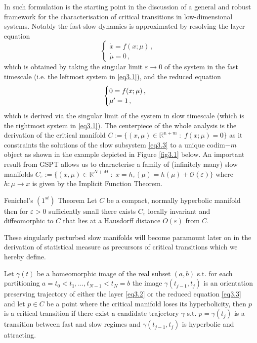 \documentclass[../main.tex]{subfiles}
\begin{document}
In \cite{Kuehn11} such formulation is the starting point in the discussion of a general and robust framework for the characterisation of critical transitions in low-dimensional systems.
Notably the fast-slow dynamics is approximated by resolving the layer equation
\begin{equation}\label{eq3.2}
   \begin{cases}
           \dot{x}=f(x;\mu) \,, \\
           \dot{\mu}=0 \,, 
   \end{cases}
\end{equation}
which is obtained by taking the singular limit $\varepsilon\to0$ of the system in the fast timescale (i.e. the leftmost system in \eqref{eq3.1}), and the reduced equation
\begin{equation}\label{eq3.3}
   \begin{cases}
      0=f(x;\mu) \,, \\
      \mu'=1 \,, 
   \end{cases}
\end{equation}
which is derived via the singular limit of the system in slow timescale (which is the rightmost system in \eqref{eq3.1}).
The centerpiece of the whole analysis is the derivation of the critical manifold $C:=\{(x,\mu)\in \mathbb{R}^{n+m}\;:\;f(x;\mu)=0\}$ as it constraints the solutions of the slow subsystem \eqref{eq3.3} to a unique codim$-m$ object as shown in the example depicted in Figure \ref{fig3.1} below.
An important result from GSPT allows us to characterise a family of (infinitely many) slow manifolds $C_{\varepsilon}:=\{(x,\mu)\in \mathbb{R}^{N+M}\;:\;x=h_{\varepsilon}(\mu)=h(\mu)+\mathcal{O}(\varepsilon)\}$ where $h:\mu\to x$ is given by the Implicit Function Theorem.
\begin{theorem}[label=thm3.1]{Fenichel's $(1^{st})$ Theorem}{}
     Let $C$ be a compact, normally hyperbolic manifold then for $\varepsilon>0$ sufficiently small there exists $C_{\varepsilon}$ locally invariant and diffeomorphic to $C$ that lies at a Hausdorff distance $O(\varepsilon)$ from $C$.
\end{theorem}
These singularly perturbed slow manifolds will become paramount later on in the derivation of statistical measure as precursors of critical transitions which we hereby define.
\begin{definition}\label{def3.1}
     Let $\gamma(t)$ be a homeomorphic image of the real subset $(a,b)$ s.t. for each partitioning ${a=t_{0}<t_1,\dots,t_{N-1}<t_N=b}$ the image $\gamma(t_{j-1},t_j)$ is an orientation preserving trajectory of either the layer \eqref{eq3.2} or the reduced equation \eqref{eq3.3} and let $p\in C$ be a point where the critical manifold loses its hyperbolicity, then $p$ is a critical transition if there exist a candidate trajectory $\gamma$ s.t. $p = \gamma(t_j)$ is a transition between fast and slow regimes and $\gamma(t_{j-1},t_j)$ is hyperbolic and attracting.
\end{definition}
\end{document}
